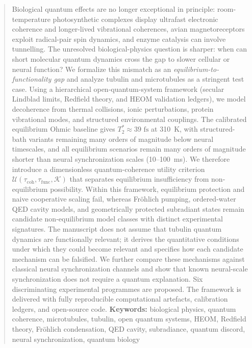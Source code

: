 \documentclass[twocolumn,10pt]{article}
\newcommand{\fs}{\text{~fs}}
\begin{document}
\begin{abstract}
Biological quantum effects are no longer exceptional in principle: room-temperature
photosynthetic complexes display ultrafast electronic coherence and longer-lived
vibrational coherences, avian magnetoreceptors exploit radical-pair spin dynamics,
and enzyme catalysis can involve tunnelling. The unresolved biological-physics
question is sharper: when can short molecular quantum dynamics cross the gap to
slower cellular or neural function? We formalize this mismatch as an
\emph{equilibrium-to-functionality gap} and analyze tubulin and microtubules as a
stringent test case. Using a hierarchical open-quantum-system framework
(secular Lindblad limits, Redfield theory, and HEOM validation ledgers), we model
decoherence from thermal collisions, ionic perturbations, protein vibrational
modes, and structured environmental couplings. The calibrated equilibrium Ohmic
baseline gives $T_2^*\approx 39\fs$ at 310~K, with structured-bath variants remaining many orders of magnitude below neural timescales, and all equilibrium scenarios remain
many orders of magnitude shorter than neural synchronization scales
(10--100~ms). We therefore introduce a dimensionless quantum-coherence utility
criterion $\mathcal{U}(\tau_{\text{coh}},\tau_{\text{func}},\mathcal{K})$ that
separates equilibrium insufficiency from non-equilibrium possibility. Within this
framework, equilibrium protection and naive cooperative scaling fail, whereas
Fr\"ohlich pumping, ordered-water QED cavity models, and geometrically protected
subradiant states remain candidate non-equilibrium model classes with distinct
experimental signatures. The manuscript does not assume that tubulin quantum
dynamics are functionally relevant; it derives the quantitative conditions under
which they could become relevant and specifies how each candidate mechanism can
be falsified. We further compare these mechanisms against classical neural
synchronization channels and show that known neural-scale synchronization does
not require a quantum explanation. Six discriminating experimental programmes
are proposed. The framework is delivered with fully reproducible computational
artefacts, calibration ledgers, and open-source code.
\vspace{0.2cm}
\noindent\textbf{Keywords:} biological physics, quantum coherence, microtubules,
tubulin, open quantum systems, HEOM, Redfield theory, Fr\"ohlich condensation,
QED cavity, subradiance, quantum discord, neural synchronization, quantum biology
\end{abstract}
\end{document}
